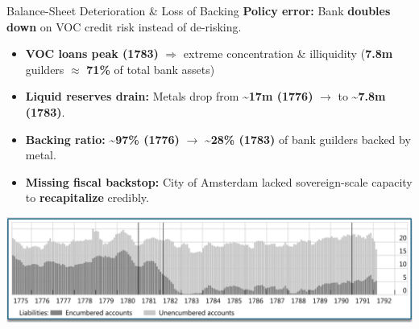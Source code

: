 \documentclass[aspectratio=169, xcolor=table]{beamer}
\begin{document}
\begin{frame}{Balance-Sheet Deterioration \& Loss of Backing}
  \textbf{Policy error:} Bank \textbf{doubles down} on VOC credit risk instead of de-risking.
  \begin{itemize}
    \item \textbf{VOC loans peak (1783)} $\Rightarrow$ extreme concentration \& illiquidity (\textbf{7.8m} guilders $\approx$ \textbf{71\%} of total bank assets)
    \item \textbf{Liquid reserves drain:} Metals drop from \textbf{\textasciitilde{}17m (1776)} $\rightarrow$ to \textbf{\textasciitilde{}7.8m (1783)}.
    \item \textbf{Backing ratio:} \textbf{\textasciitilde{}97\% (1776)} $\rightarrow$ \textbf{\textasciitilde{}28\% (1783)} of bank guilders backed by metal.
    \item \textbf{Missing fiscal backstop:} City of Amsterdam lacked sovereign-scale capacity to \textbf{recapitalize} credibly.
  \end{itemize}
  \begin{center}
    \includegraphics[width=0.8\linewidth]{pasted-images/encumbered_accounts.png}
  \end{center}
\end{frame}
\end{document}
